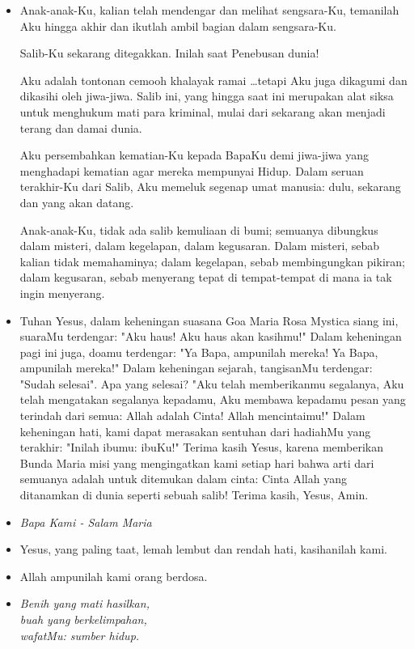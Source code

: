 \documentclass[a5paper,headsepline,titlepage,10pt,nnormalheadings,DIVcalc]{scrbook}
\newcommand{\BU}[1]{\begin{itemize} \item[U:] #1 \end{itemize}}
\newcommand{\BP}[1]{\begin{itemize} \item[P:] #1 \end{itemize}}
\newcommand{\kasihanilahKami}{\BP{Yesus, yang paling taat, lemah lembut dan rendah hati, kasihanilah kami.}
\BU{Allah ampunilah kami orang berdosa.}}
\begin{document}
\BP{Anak-anak-Ku, kalian telah mendengar dan melihat sengsara-Ku, temanilah Aku hingga akhir dan ikutlah ambil bagian dalam sengsara-Ku.

Salib-Ku sekarang ditegakkan. Inilah saat Penebusan dunia!

Aku adalah tontonan cemooh khalayak ramai \dots  tetapi Aku juga dikagumi dan dikasihi oleh jiwa-jiwa. Salib ini, yang hingga saat ini merupakan alat siksa untuk menghukum mati para kriminal, mulai dari sekarang akan menjadi terang dan damai dunia.

Aku persembahkan kematian-Ku kepada BapaKu demi jiwa-jiwa yang menghadapi kematian agar mereka mempunyai Hidup. Dalam seruan terakhir-Ku dari Salib, Aku memeluk segenap umat manusia: dulu, sekarang dan yang akan datang.

Anak-anak-Ku, tidak ada salib kemuliaan di bumi; semuanya dibungkus dalam misteri, dalam kegelapan, dalam kegusaran. Dalam misteri, sebab kalian tidak memahaminya; dalam kegelapan, sebab membingungkan pikiran; dalam kegusaran, sebab menyerang tepat di tempat-tempat di mana ia tak ingin menyerang.}

\BU{Tuhan Yesus, dalam keheningan suasana Goa Maria Rosa Mystica siang ini, suaraMu terdengar: "Aku haus! Aku haus akan kasihmu!" Dalam keheningan pagi ini juga, doamu terdengar: "Ya Bapa, ampunilah mereka! Ya Bapa, ampunilah mereka!" Dalam keheningan sejarah, tangisanMu terdengar: "Sudah selesai". Apa yang selesai? "Aku telah memberikanmu segalanya, Aku telah mengatakan segalanya kepadamu, Aku membawa kepadamu pesan yang terindah dari semua: Allah adalah Cinta! Allah mencintaimu!" Dalam keheningan hati, kami dapat merasakan sentuhan dari hadiahMu yang terakhir: "Inilah ibumu: ibuKu!" Terima kasih Yesus, karena memberikan Bunda Maria misi yang mengingatkan kami setiap hari bahwa arti dari semuanya adalah untuk ditemukan dalam cinta: Cinta Allah yang ditanamkan di dunia seperti sebuah salib! Terima kasih, Yesus, Amin. }

\large\begin{itemize}\item[~]\it{Bapa Kami - Salam Maria}\end{itemize}\normalsize
\kasihanilahKami

\begin{itemize}
\item[13.] \it{Benih yang mati hasilkan,\\
	buah yang berkelimpahan,\\
	wafatMu: sumber hidup.}
\end{itemize}
\end{document}
